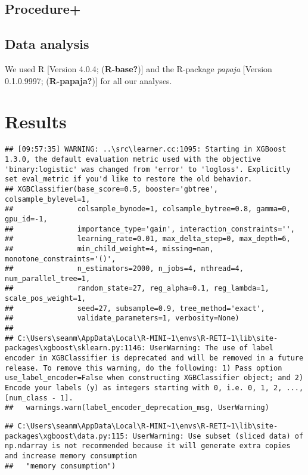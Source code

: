 \documentclass[
  english,
  man]{article}
\begin{document}
\hypertarget{procedure}{%
\subsection{Procedure+}\label{procedure}}

\hypertarget{data-analysis}{%
\subsection{Data analysis}\label{data-analysis}}

We used R {[}Version 4.0.4; (\textbf{R-base?}){]} and the R-package \emph{papaja} {[}Version 0.1.0.9997; (\textbf{R-papaja?}){]} for all our analyses.

\hypertarget{results}{%
\section{Results}\label{results}}

\begin{verbatim}
## [09:57:35] WARNING: ..\src\learner.cc:1095: Starting in XGBoost 1.3.0, the default evaluation metric used with the objective 'binary:logistic' was changed from 'error' to 'logloss'. Explicitly set eval_metric if you'd like to restore the old behavior.
## XGBClassifier(base_score=0.5, booster='gbtree', colsample_bylevel=1,
##               colsample_bynode=1, colsample_bytree=0.8, gamma=0, gpu_id=-1,
##               importance_type='gain', interaction_constraints='',
##               learning_rate=0.01, max_delta_step=0, max_depth=6,
##               min_child_weight=4, missing=nan, monotone_constraints='()',
##               n_estimators=2000, n_jobs=4, nthread=4, num_parallel_tree=1,
##               random_state=27, reg_alpha=0.1, reg_lambda=1, scale_pos_weight=1,
##               seed=27, subsample=0.9, tree_method='exact',
##               validate_parameters=1, verbosity=None)
## 
## C:\Users\seanm\AppData\Local\R-MINI~1\envs\R-RETI~1\lib\site-packages\xgboost\sklearn.py:1146: UserWarning: The use of label encoder in XGBClassifier is deprecated and will be removed in a future release. To remove this warning, do the following: 1) Pass option use_label_encoder=False when constructing XGBClassifier object; and 2) Encode your labels (y) as integers starting with 0, i.e. 0, 1, 2, ..., [num_class - 1].
##   warnings.warn(label_encoder_deprecation_msg, UserWarning)
\end{verbatim}

\begin{verbatim}
## C:\Users\seanm\AppData\Local\R-MINI~1\envs\R-RETI~1\lib\site-packages\xgboost\data.py:115: UserWarning: Use subset (sliced data) of np.ndarray is not recommended because it will generate extra copies and increase memory consumption
##   "memory consumption")
\end{verbatim}
\end{document}
